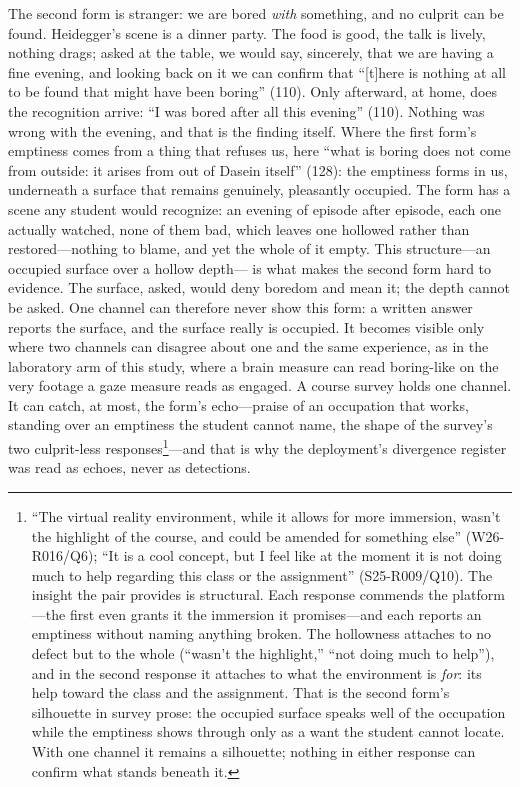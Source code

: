 The second form is stranger: we are bored \textit{with} something, and
no culprit can be found. Heidegger's scene is a dinner party. The food
is good, the talk is lively, nothing drags; asked at the table, we
would say, sincerely, that we are having a fine evening, and looking
back on it we can confirm that ``[t]here is nothing at all to be found
that might have been boring'' (110). Only afterward, at home, does the
recognition arrive: ``I was bored after all this evening'' (110).
Nothing was wrong with the evening, and that is the finding itself.
Where the first form's emptiness comes from a thing that refuses us,
here ``what is boring does not come from outside: it arises from out
of Dasein itself'' (128): the emptiness forms in us, underneath a
surface that remains genuinely, pleasantly occupied. The form has a
scene any student would recognize: an evening of episode after
episode, each one actually watched, none of them bad, which leaves one
hollowed rather than restored---nothing to blame, and yet the whole of
it empty. This structure---an occupied surface over a hollow depth---
is what makes the second form hard to evidence. The surface, asked,
would deny boredom and mean it; the depth cannot be asked. One channel
can therefore never show this form: a written answer reports the
surface, and the surface really is occupied. It becomes visible only
where two channels can disagree about one and the same experience, as
in the laboratory arm of this study, where a brain measure can read
boring-like on the very footage a gaze measure reads as engaged. A
course survey holds one channel. It can catch, at most, the form's
echo---praise of an occupation that works, standing over an emptiness
the student cannot name, the shape of the survey's two culprit-less
responses\footnote{``The virtual reality environment, while it allows
for more immersion, wasn't the highlight of the course, and could be
amended for something else'' (W26-R016/Q6); ``It is a cool concept,
but I feel like at the moment it is not doing much to help regarding
this class or the assignment'' (S25-R009/Q10). The insight the pair
provides is structural. Each response commends the platform---the
first even grants it the immersion it promises---and each reports an
emptiness without naming anything broken. The hollowness attaches to
no defect but to the whole (``wasn't the highlight,'' ``not doing much
to help''), and in the second response it attaches to what the
environment is \textit{for}: its help toward the class and the
assignment. That is the second form's silhouette in survey prose: the
occupied surface speaks well of the occupation while the emptiness
shows through only as a want the student cannot locate. With one
channel it remains a silhouette; nothing in either response can
confirm what stands beneath it.}---and that is why the deployment's
divergence register was read as echoes, never as detections.

